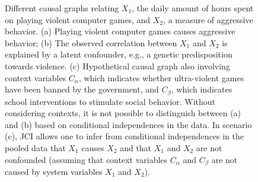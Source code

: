 \documentclass[twoside,11pt]{article}
\newcommand{\Joris}[1]{{\color{blue}#1}}
\newcommand{\Sara}[1]{{\color{purple}#1}}
\newcommand{\Tom}[1] {{\color{green}#1}}
\begin{document}
\begin{figure}\centering%
  \caption{Different causal graphs relating $X_1$, the daily amount of hours spent on playing violent computer games, and $X_2$, a measure of aggressive behavior. (a) Playing violent computer games causes aggressive behavior; (b) The observed correlation between $X_1$ and $X_2$ is explained by a latent confounder, e.g., a genetic predisposition towards violence. (c) Hypothetical causal graph also involving context variables $C_\alpha$, which indicates whether ultra-violent games have been
  banned by the government, and $C_\beta$, which indicates school interventions to stimulate social behavior. Without considering contexts, it is not possible to distinguish between (a) and (b) based on conditional independences in the data. In scenario (c), JCI allows one to infer from conditional independences in the pooled data that $X_1$ causes $X_2$ and that $X_1$ and $X_2$ are not confounded (assuming that context variables $C_\alpha$ and $C_\beta$ are not caused by system variables $X_1$ and $X_2$).\label{fig:example}}
\end{figure}

\end{document}
